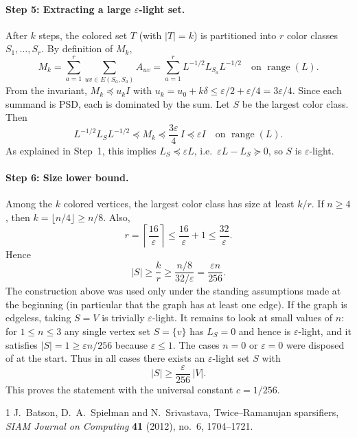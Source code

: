 \documentclass{article}
\begin{document}
\paragraph{Step 5: Extracting a large $\varepsilon$-light set.}
After $k$ steps, the colored set $T$ (with $|T| = k$) is partitioned into $r$ color classes
$S_1, \ldots, S_r$. By definition of $M_k$,
\[
  M_k = \sum_{a=1}^r \sum_{uv \in E(S_a, S_a)} A_{uv} = \sum_{a=1}^r L^{-1/2} L_{S_a} L^{-1/2}
  \quad \text{on } \operatorname{range}(L).
\]
From the invariant, $M_k \preceq u_k I$ with $u_k = u_0 + k\delta \le \varepsilon/2 + \varepsilon/4 = 3\varepsilon/4$.
Since each summand is PSD, each is dominated by the sum. Let $S$ be the largest color class.
Then
\[
  L^{-1/2} L_S L^{-1/2} \preceq M_k \preceq \frac{3\varepsilon}{4}\,I \preceq \varepsilon I
  \quad \text{on } \operatorname{range}(L).
\]
As explained in Step~1, this implies $L_S \preceq \varepsilon L$, i.e.\ $\varepsilon L - L_S \succeq 0$, so $S$
is $\varepsilon$-light.

\paragraph{Step 6: Size lower bound.}
Among the $k$ colored vertices, the largest color class has size at least $k/r$. If $n \ge 4$,
then $k = \lfloor n/4 \rfloor \ge n/8$. Also,
\[
  r = \left\lceil \frac{16}{\varepsilon} \right\rceil \le \frac{16}{\varepsilon} + 1 \le \frac{32}{\varepsilon}.
\]
Hence
\[
  |S| \ge \frac{k}{r} \ge \frac{n/8}{32/\varepsilon} = \frac{\varepsilon n}{256}.
\]
The construction above was used only under the standing assumptions made at the beginning
(in particular that the graph has at least one edge). If the graph is edgeless, taking $S = V$
is trivially $\varepsilon$-light. It remains to look at small values of $n$: for $1 \le n \le 3$ any
single vertex set $S = \{v\}$ has $L_S = 0$ and hence is $\varepsilon$-light, and it satisfies
$|S| = 1 \ge \varepsilon n/256$ because $\varepsilon \le 1$. The cases $n = 0$ or $\varepsilon = 0$ were disposed of
at the start. Thus in all cases there exists an $\varepsilon$-light set $S$ with
\[
  |S| \ge \frac{\varepsilon}{256}\,|V|.
\]
This proves the statement with the universal constant $c = 1/256$.

\begin{thebibliography}{1}
  J.~Batson, D.~A.~Spielman and N.~Srivastava,
  Twice--Ramanujan sparsifiers,
  \textit{SIAM Journal on Computing} \textbf{41} (2012), no.~6, 1704--1721.
\end{thebibliography}
\end{document}
